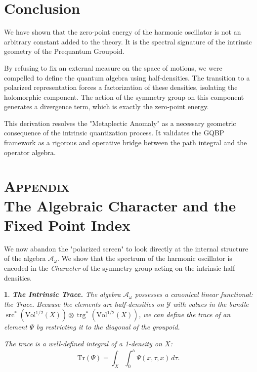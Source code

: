 \documentclass[11pt,reqno,letterpaper,twoside]{amsart}
\theoremstyle{articlestyle}
\newtheorem{article}{}
\theoremstyle{plain}
\theoremstyle{definition}
\def\artlabel[#1]{\textbf{#1.}}
\newcommand{\cA}{{\mathcal A}}
\newcommand{\cY}{{\mathcal Y}}
\DeclareMathOperator{\src}{src}
\DeclareMathOperator{\trg}{trg}
\newcommand{\0}{\hat{0}}
\newcommand{\1}{\hat{1}}
\newcommand{\Vol}{\mathrm{Vol}}
\begin{document}
  
  \section*{\textbf{Conclusion}}
  
  We have shown that the zero-point energy of the harmonic oscillator is not an arbitrary constant added to the theory.
  It is the spectral signature of the intrinsic geometry of the Prequantum Groupoid.
  
  By refusing to fix an external measure on the space of motions,
  we were compelled to define the quantum algebra using half-densities.
  The transition to a polarized representation forces a factorization of these densities,
  isolating the holomorphic component.
  The action of the symmetry group on this component generates a divergence term,
  which is exactly the zero-point energy.
  
  This derivation resolves the "Metaplectic Anomaly" as a necessary geometric consequence of the intrinsic quantization process.
  It validates the GQBP framework as a rigorous and operative bridge between the path integral and the operator algebra.
  
  
  
  \section*{\textbf{\textsc{Appendix} \\ \smallskip The Algebraic Character and the Fixed Point Index}}
  \label{sec:AlgebraicPath}
  
  We now abandon the "polarized screen" to look directly at the internal structure of the algebra $\cA_\omega$.
  We show that the spectrum of the harmonic oscillator is encoded in the \emph{Character}
  of the symmetry group acting on the intrinsic half-densities.
  
  \begin{article}\artlabel[The Intrinsic Trace]
    The algebra $\cA_\omega$ possesses a canonical linear functional:
    the \emph{Trace}.
    Because the elements are half-densities on $\cY$ with values in the bundle
    $\src^*(\Vol^{1/2}(X)) \otimes \trg^*(\Vol^{1/2}(X))$,
    we can define the trace of an element $\Psi$ by restricting it to the diagonal of the groupoid.
    
    The trace is a well-defined integral of a 1-density on $X$:
    $$
      \mathrm{Tr}(\Psi) = \int_X \int_0^h \Psi(x, \tau, x) \, d\tau.
      $$
  \end{article}
  
\end{document}
